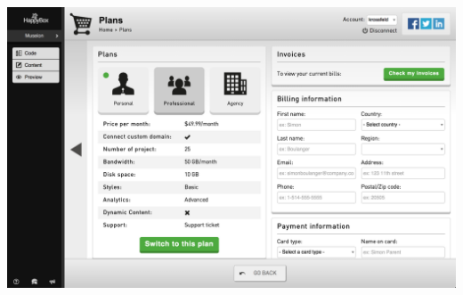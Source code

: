 \documentclass[11pt, a4paper ]{article}
\begin{document}
\begin{spacing}{1.5}
	\includegraphics[width=\textwidth]{images/HBscreen/4}


\end{spacing}
\end{document}
